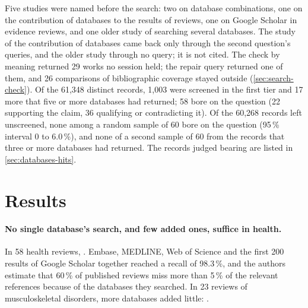 Five studies were named before the search: two on database combinations,
one on the contribution of databases to the results of reviews, one on
Google Scholar in evidence reviews, and one older study of searching
several databases.
The study of the contribution of databases came back only through the
second question's queries, and the older study through no query; it is
not cited.
The check by meaning returned 29 works no session held; the repair query
returned one of them, and 26 comparisons of bibliographic coverage stayed
outside (\cref{sec:search-check}).
Of the 61,348 distinct records, 1,003 were screened in the first tier and
17 more that five or more databases had returned; 58 bore on the question
(22 supporting the claim, 36 qualifying or contradicting it).
Of the 60,268 records left unscreened, none among a random sample of 60
bore on the question (95\,\% interval 0 to 6.0\,\%), and none of a second
sample of 60 from the records that three or more databases had returned.
The records judged bearing are listed in \cref{sec:databases-hits}.

\section{Results}
\label{sec:databases-results}

\paragraph{No single database's search, and few added ones, suffice in health.}
In 58 health reviews, .
Embase, MEDLINE, Web of Science and the first 200 results of Google
Scholar together reached a recall of 98.3\,\%, and the authors estimate
that 60\,\% of published reviews miss more than 5\,\% of the relevant
references because of the databases they searched.
In 23 reviews of musculoskeletal disorders, more databases added little:
.

